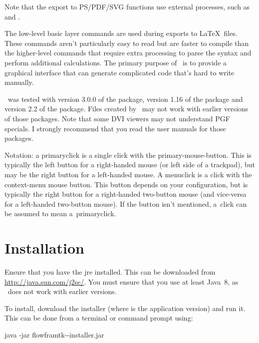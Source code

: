 Note that the export to PS/PDF/SVG functions use external
processes, such as  and .

The low-level  basic layer commands are used during
exports to \LaTeX\ files. These commands aren't particularly easy to
read but are faster to compile than the higher-level commands that
require extra processing to parse the syntax and perform additional
calculations. The primary purpose of \FlowframTk\ is to provide a
graphical interface that can generate complicated code that's hard
to write manually.

\FlowframTk\ was tested with version 3.0.0 of the 
package, version 1.16 of the  package and version
2.2 of the  package. Files created by \FlowframTk\
may not work with earlier versions of those packages. Note that some
DVI viewers may not understand PGF specials. I strongly recommend
that you read the user manuals for those packages.


Notation: a \gls{primaryclick} is a single click with the
\gls{primary-mouse-button}. This is typically the left button for a
right-handed mouse (or left side of a trackpad), but may be the
right button for a left-handed mouse. A \gls{menuclick} is a click
with the \gls{context-menu} mouse button. This button depends on your
configuration, but is typically the right button for a right-handed
two-button mouse (and vice-versa for a left-handed two-button mouse). 
If the button isn't mentioned, a~\gls{click} can
be assumed to mean a~\gls{primaryclick}.

\chapter{Installation}
\label{sec:install}

Ensure that you have the \gls{jre} installed.
This can be downloaded from \url{http://java.sun.com/j2se/}.
You must ensure that you use at least Java~8, as \FlowframTk\
does not work with earlier versions.

To install, download the installer
(where \meta{appversion} is the application version) and run it. 
This can be done from a terminal or command prompt using:

\begin{terminal}
java -jar flowframtk--installer.jar
\end{terminal}

